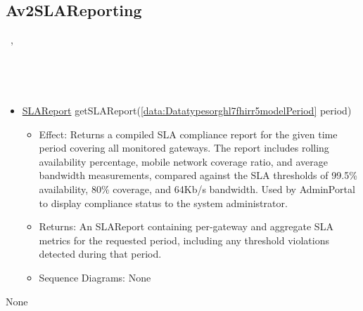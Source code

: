   \subsection{Av2SLAReporting}\label{int:InterfacesAv2SLAReporting}
    \begin{description}
      \item[Provided by:] \iconcomponent{}~, \iconcomponent{}~
      \item[Required by:] \iconcomponent{}~ 
      \item[Operations:] ~
    \begin{itemize}[noitemsep,nolistsep,leftmargin=-.25cm]
      \item \textsf{{\colorbox{red!30}{\underline{SLAReport}}} getSLAReport(\ref{data:Datatypesorghl7fhirr5modelPeriod} period)}
        \begin{itemize}[noitemsep,nolistsep]
           \item Effect: Returns a compiled SLA compliance report for the given time period covering all monitored gateways. The report includes rolling availability percentage, mobile network coverage ratio, and average bandwidth measurements, compared against the SLA thresholds of 99.5\% availability, 80\% coverage, and 64Kb/s bandwidth. Used by AdminPortal to display compliance status to the system administrator.
 
           \item Returns: An SLAReport containing per-gateway and aggregate SLA metrics for the requested period, including any threshold violations detected during that period.
           \item Sequence Diagrams: None
        \end{itemize}
    \end{itemize}
      \item[Diagrams:] None
    \end{description}

